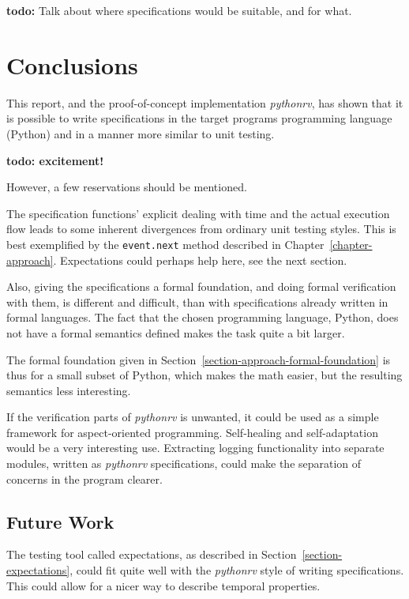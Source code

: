 \documentclass[a4paper,11pt]{kth-mag}
\newcommand{\todo}[1]{\textbf{todo: #1}}
\begin{document}
\todo{}
Talk about where specifications would be suitable, and for what.





\pagestyle{newchap}
\chapter{Conclusions} \label{chapter-conclusions}

This report, and the proof-of-concept implementation \textit{pythonrv}, has
shown that it is possible to write specifications in the target programs
programming language (Python) and in a manner more similar to unit testing.

\todo{excitement!}

However, a few reservations should be mentioned.

The specification functions' explicit dealing with time and the actual
execution flow leads to some inherent divergences from ordinary unit testing
styles. This is best exemplified by the \texttt{event.next} method described in
Chapter~\ref{chapter-approach}. Expectations could perhaps help here, see the
next section.

Also, giving the specifications a formal foundation, and doing formal
verification with them, is different and difficult, than with specifications
already written in formal languages. The fact that the chosen programming
language, Python, does not have a formal semantics defined makes the task quite
a bit larger.

The formal foundation given in Section~\ref{section-approach-formal-foundation}
is thus for a small subset of Python, which makes the math easier, but the
resulting semantics less interesting.

If the verification parts of \textit{pythonrv} is unwanted, it could be used as
a simple framework for aspect-oriented programming. Self-healing and
self-adaptation would be a very interesting use. Extracting logging
functionality into separate modules, written as \textit{pythonrv}
specifications, could make the separation of concerns in the program clearer.

\section{Future Work}

The testing tool called expectations, as described in
Section~\ref{section-expectations}, could fit quite well with the
\textit{pythonrv} style of writing specifications. This could allow for a nicer
way to describe temporal properties.
\end{document}
